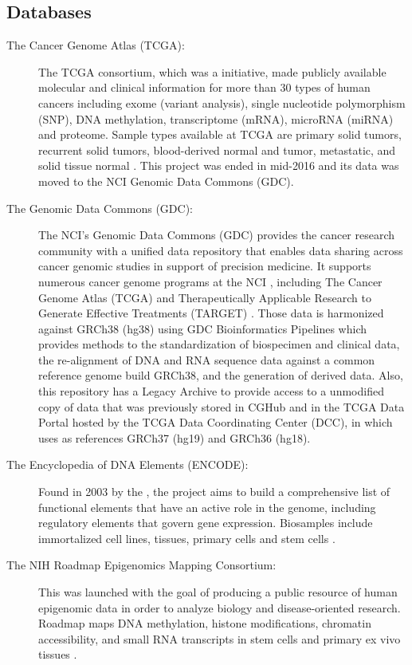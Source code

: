 \subsection{Databases} \label{susec:db}
\begin{description}
  \item [The Cancer Genome Atlas (TCGA):] The TCGA consortium, which was a  initiative, made publicly available molecular and clinical information for more than 30 types of human cancers including exome (variant analysis), single nucleotide polymorphism (SNP), DNA methylation, transcriptome (mRNA), microRNA (miRNA) and proteome. Sample types available at TCGA are primary solid tumors, recurrent solid tumors, blood-derived normal and tumor, metastatic, and solid tissue normal \cite{weinstein2013cancer}. This project was ended in mid-2016 and its data was moved to  the NCI Genomic Data Commons (GDC).
  \item [The Genomic Data Commons (GDC):]  The NCI's Genomic Data Commons (GDC) provides the cancer research community with a unified data repository that enables data sharing across cancer genomic studies in support of precision medicine.
  It supports numerous cancer genome programs at the NCI , including The Cancer Genome Atlas (TCGA) and Therapeutically Applicable Research to Generate Effective Treatments (TARGET) \cite{GDC_web}.
  Those data is harmonized against GRCh38 (hg38) using GDC Bioinformatics Pipelines which provides methods to the standardization of biospecimen and clinical data, the re-alignment of DNA and RNA sequence data against a common reference genome build GRCh38, and the generation of derived data. Also, this repository has a Legacy Archive to provide access to a unmodified copy of data that was previously stored in CGHub \cite{wilks2014cancer} and in the TCGA Data Portal hosted by the TCGA Data Coordinating Center (DCC), in which uses as references GRCh37 (hg19) and GRCh36 (hg18).
  \item [The Encyclopedia of DNA Elements (ENCODE):] Found in 2003 by the , the project aims to build a comprehensive list of functional elements that have an active role in the genome, including regulatory elements that govern gene expression. Biosamples include immortalized cell lines, tissues, primary cells and stem cells \cite{encode2011user}.
  \item [The NIH Roadmap Epigenomics Mapping Consortium:] This was launched with the goal of producing a public resource of human epigenomic data in order to analyze biology and disease-oriented research. Roadmap maps DNA methylation, histone modifications, chromatin accessibility, and small RNA transcripts in stem cells and primary ex vivo tissues
  \cite{Fingerman,Bernstein}.
\end{description}

